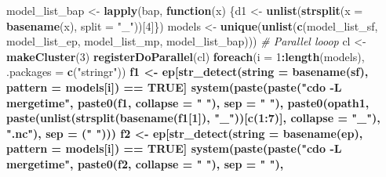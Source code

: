 \documentclass[]{book}
\newenvironment{Shaded}{\begin{snugshade}}{\end{snugshade}}
\newcommand{\CommentTok}[1]{\textcolor[rgb]{0.56,0.35,0.01}{\textit{#1}}}
\newcommand{\ControlFlowTok}[1]{\textcolor[rgb]{0.13,0.29,0.53}{\textbf{#1}}}
\newcommand{\DataTypeTok}[1]{\textcolor[rgb]{0.13,0.29,0.53}{#1}}
\newcommand{\DecValTok}[1]{\textcolor[rgb]{0.00,0.00,0.81}{#1}}
\newcommand{\KeywordTok}[1]{\textcolor[rgb]{0.13,0.29,0.53}{\textbf{#1}}}
\newcommand{\NormalTok}[1]{#1}
\newcommand{\OperatorTok}[1]{\textcolor[rgb]{0.81,0.36,0.00}{\textbf{#1}}}
\newcommand{\OtherTok}[1]{\textcolor[rgb]{0.56,0.35,0.01}{#1}}
\newcommand{\StringTok}[1]{\textcolor[rgb]{0.31,0.60,0.02}{#1}}
\begin{document}
\begin{Shaded}
\begin{Highlighting}[]
{\NormalTok{    model_list_bap <-}\StringTok{ }\KeywordTok{lapply}\NormalTok{(bap, }\ControlFlowTok{function}\NormalTok{(x) }
\NormalTok{      \{d1 <-}\StringTok{ }\KeywordTok{unlist}\NormalTok{(}\KeywordTok{strsplit}\NormalTok{(}\DataTypeTok{x =} \KeywordTok{basename}\NormalTok{(x), }\DataTypeTok{split =} \StringTok{"_"}\NormalTok{))[}\DecValTok{4}\NormalTok{]\})}
\NormalTok{    models <-}\StringTok{ }\KeywordTok{unique}\NormalTok{(}\KeywordTok{unlist}\NormalTok{(}\KeywordTok{c}\NormalTok{(model_list_sf, model_list_ep, model_list_mp, model_list_bap)))}
  \CommentTok{# Parallel looop}
\NormalTok{    cl <-}\StringTok{ }\KeywordTok{makeCluster}\NormalTok{(}\DecValTok{3}\NormalTok{)}
    \KeywordTok{registerDoParallel}\NormalTok{(cl)}
    \KeywordTok{foreach}\NormalTok{(}\DataTypeTok{i =} \DecValTok{1}\OperatorTok{:}\KeywordTok{length}\NormalTok{(models), }\DataTypeTok{.packages =} \KeywordTok{c}\NormalTok{(}\StringTok{"stringr"}\NormalTok{)) }\OperatorTok{%
\NormalTok{      f1 <-}\StringTok{ }\NormalTok{ep[}\KeywordTok{str_detect}\NormalTok{(}\DataTypeTok{string =} \KeywordTok{basename}\NormalTok{(sf), }\DataTypeTok{pattern =}\NormalTok{ models[i]) }\OperatorTok{==}\StringTok{ }\OtherTok{TRUE}\NormalTok{]}
      \KeywordTok{system}\NormalTok{(}\KeywordTok{paste}\NormalTok{(}\KeywordTok{paste}\NormalTok{(}\StringTok{"cdo -L mergetime"}\NormalTok{, }\KeywordTok{paste0}\NormalTok{(f1, }\DataTypeTok{collapse =} \StringTok{" "}\NormalTok{), }\DataTypeTok{sep =} \StringTok{" "}\NormalTok{), }
                   \KeywordTok{paste0}\NormalTok{(opath1, }\KeywordTok{paste}\NormalTok{(}\KeywordTok{unlist}\NormalTok{(}\KeywordTok{strsplit}\NormalTok{(}\KeywordTok{basename}\NormalTok{(f1[}\DecValTok{1}\NormalTok{]), }\StringTok{"_"}\NormalTok{))[}\KeywordTok{c}\NormalTok{(}\DecValTok{1}\OperatorTok{:}\DecValTok{7}\NormalTok{)], }
                                        \DataTypeTok{collapse =} \StringTok{"_"}\NormalTok{), }\StringTok{".nc"}\NormalTok{), }\DataTypeTok{sep =}\NormalTok{ (}\StringTok{" "}\NormalTok{)))}
\NormalTok{      f2 <-}\StringTok{ }\NormalTok{ep[}\KeywordTok{str_detect}\NormalTok{(}\DataTypeTok{string =} \KeywordTok{basename}\NormalTok{(ep), }\DataTypeTok{pattern =}\NormalTok{ models[i]) }\OperatorTok{==}\StringTok{ }\OtherTok{TRUE}\NormalTok{]}
      \KeywordTok{system}\NormalTok{(}\KeywordTok{paste}\NormalTok{(}\KeywordTok{paste}\NormalTok{(}\StringTok{"cdo -L mergetime"}\NormalTok{, }\KeywordTok{paste0}\NormalTok{(f2, }\DataTypeTok{collapse =} \StringTok{" "}\NormalTok{), }\DataTypeTok{sep =} \StringTok{" "}\NormalTok{), }
}}
\end{Highlighting}
\end{Shaded}
\end{document}
